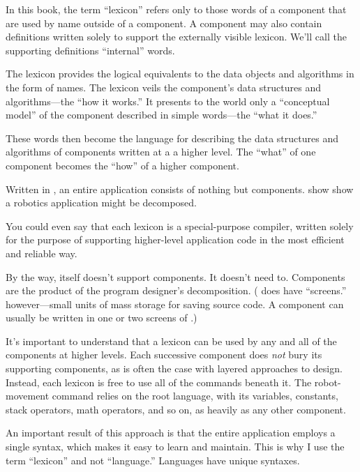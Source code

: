 In this book, the term ``lexicon'' refers only to those words of a
component that are used by name outside of a component. A component
may also contain definitions written solely to support the externally
visible lexicon. We'll call the supporting definitions ``internal''
words.


The lexicon provides the logical equivalents to the data objects and
algorithms in the form of names. The lexicon veils the component's
data structures and algorithms---the ``how it works.'' It presents to
the world only a ``conceptual model'' of the component described in
simple words---the ``what it does.''

These words then become the language for describing the data
structures and algorithms of components written at a a higher level.
The ``what'' of one component becomes the ``how'' of a higher component.


Written in \Forth{}, an entire application consists of nothing but
components.   show show a robotics application might be
decomposed.

You could even say that each lexicon is a special-purpose compiler,
written solely for the purpose of supporting higher-level application
code in the most efficient and reliable way.

By the way, \Forth{} itself doesn't support components. It doesn't need
to. Components are the product of the program designer's decomposition.
(\Forth{} does have ``screens.''%
however---small units of mass storage for saving source code. A
component can usually be written in one or two screens of \Forth{}.)

It's important to understand that a lexicon can be used by any and
all of the components at higher levels. Each successive component
does \emph{not} bury its supporting components, as is often the case
with layered approaches to design. Instead, each lexicon is free to
use all of the commands beneath it. The robot-movement command relies
on the root language, with its variables, constants, stack operators,
math operators, and so on, as heavily as any other component.%
%

An important result of this approach is that the entire application
employs a single syntax, which makes it easy to learn and maintain.
This is why I use the term ``lexicon'' and not ``language.''
Languages have unique syntaxes.%

